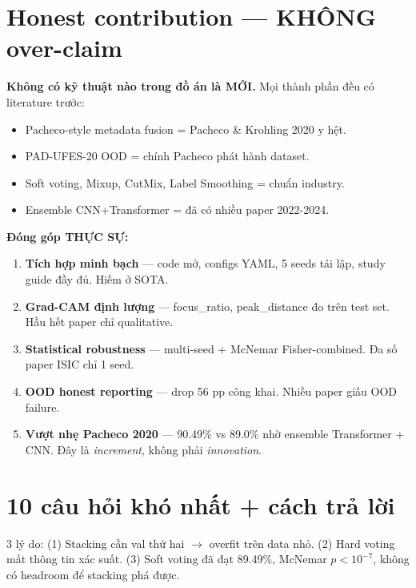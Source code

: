 \documentclass[11pt,a4paper]{article}
\begin{document}
\section{Honest contribution --- KHÔNG over-claim}

\begin{idea}
\textbf{Không có kỹ thuật nào trong đồ án là MỚI.} Mọi thành phần đều có literature trước:
\begin{itemize}[leftmargin=*]
  \item Pacheco-style metadata fusion = Pacheco \& Krohling 2020 y hệt.
  \item PAD-UFES-20 OOD = chính Pacheco phát hành dataset.
  \item Soft voting, Mixup, CutMix, Label Smoothing = chuẩn industry.
  \item Ensemble CNN+Transformer = đã có nhiều paper 2022-2024.
\end{itemize}

\textbf{Đóng góp THỰC SỰ:}
\begin{enumerate}[leftmargin=*]
  \item \textbf{Tích hợp minh bạch} --- code mở, configs YAML, 5 seeds tái lập, study guide đầy đủ. Hiếm ở SOTA.
  \item \textbf{Grad-CAM định lượng} --- focus\_ratio, peak\_distance đo trên test set. Hầu hết paper chỉ qualitative.
  \item \textbf{Statistical robustness} --- multi-seed + McNemar Fisher-combined. Đa số paper ISIC chỉ 1 seed.
  \item \textbf{OOD honest reporting} --- drop 56 pp công khai. Nhiều paper giấu OOD failure.
  \item \textbf{Vượt nhẹ Pacheco 2020} --- 90.49\% vs 89.0\% nhờ ensemble Transformer + CNN. Đây là \textit{increment}, không phải \textit{innovation}.
\end{enumerate}
\end{idea}

\section{10 câu hỏi khó nhất + cách trả lời}

\begin{qa}
3 lý do: (1) Stacking cần val thứ hai $\to$ overfit trên data nhỏ. (2) Hard voting mất thông tin xác suất. (3) Soft voting đã đạt 89.49\%, McNemar $p < 10^{-7}$, không có headroom để stacking phá được.
\end{qa}
\end{document}
